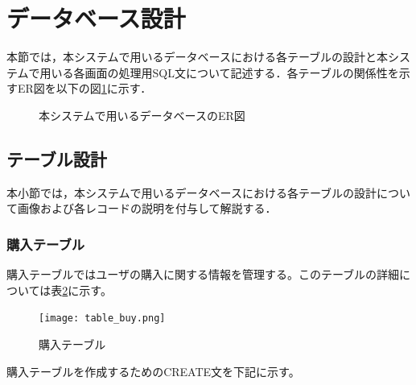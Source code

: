 \documentclass[a4j]{jarticle}
\begin{document}
\section{データベース設計}
本節では，本システムで用いるデータベースにおける各テーブルの設計と本システムで用いる各画面の処理用SQL文について記述する．各テーブルの関係性を示すER図を以下の図\ref{tab:ER}に示す．
\begin{figure}[H]
\begin{center}
\caption{本システムで用いるデータベースのER図}
\label{tab:ER}
\end{center}
\end{figure}

\subsection{テーブル設計}
本小節では，本システムで用いるデータベースにおける各テーブルの設計について画像および各レコードの説明を付与して解説する．
\subsubsection{購入テーブル}
購入テーブルではユーザの購入に関する情報を管理する。このテーブルの詳細については表\ref{table_buy}に示す。


\begin{figure}[H]
  \begin{center}
    \texttt{[image: table\_buy.png]} \\
    \caption{購入テーブル}
    \label{table_buy}
  \end{center}
\end{figure}
購入テーブルを作成するためのCREATE文を下記に示す。
\end{document}
